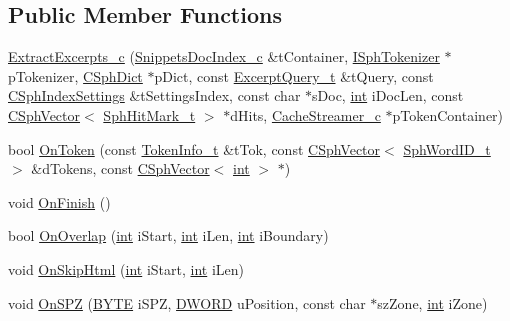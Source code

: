 \subsection*{Public Member Functions}
\begin{DoxyCompactItemize}
\item 
\hyperlink{classExtractExcerpts__c_a52457952280f31ca553f5a97fb16feb9}{Extract\-Excerpts\-\_\-c} (\hyperlink{classSnippetsDocIndex__c}{Snippets\-Doc\-Index\-\_\-c} \&t\-Container, \hyperlink{classISphTokenizer}{I\-Sph\-Tokenizer} $\ast$p\-Tokenizer, \hyperlink{classCSphDict}{C\-Sph\-Dict} $\ast$p\-Dict, const \hyperlink{structExcerptQuery__t}{Excerpt\-Query\-\_\-t} \&t\-Query, const \hyperlink{structCSphIndexSettings}{C\-Sph\-Index\-Settings} \&t\-Settings\-Index, const char $\ast$s\-Doc, \hyperlink{sphinxexpr_8cpp_a4a26e8f9cb8b736e0c4cbf4d16de985e}{int} i\-Doc\-Len, const \hyperlink{classCSphVector}{C\-Sph\-Vector}$<$ \hyperlink{structSphHitMark__t}{Sph\-Hit\-Mark\-\_\-t} $>$ $\ast$d\-Hits, \hyperlink{classCacheStreamer__c}{Cache\-Streamer\-\_\-c} $\ast$p\-Token\-Container)
\item 
bool \hyperlink{classExtractExcerpts__c_afdc36b5d8a7e7117d2e9519f121c9e70}{On\-Token} (const \hyperlink{structTokenInfo__t}{Token\-Info\-\_\-t} \&t\-Tok, const \hyperlink{classCSphVector}{C\-Sph\-Vector}$<$ \hyperlink{sphinx_8h_a80a94d5984fdf9214a98f3e5e65df963}{Sph\-Word\-I\-D\-\_\-t} $>$ \&d\-Tokens, const \hyperlink{classCSphVector}{C\-Sph\-Vector}$<$ \hyperlink{sphinxexpr_8cpp_a4a26e8f9cb8b736e0c4cbf4d16de985e}{int} $>$ $\ast$)
\item 
void \hyperlink{classExtractExcerpts__c_a71ecb0fad5dc0977e084d684830cdfe6}{On\-Finish} ()
\item 
bool \hyperlink{classExtractExcerpts__c_a613089ffd79cd73f0c1721e39a802b6c}{On\-Overlap} (\hyperlink{sphinxexpr_8cpp_a4a26e8f9cb8b736e0c4cbf4d16de985e}{int} i\-Start, \hyperlink{sphinxexpr_8cpp_a4a26e8f9cb8b736e0c4cbf4d16de985e}{int} i\-Len, \hyperlink{sphinxexpr_8cpp_a4a26e8f9cb8b736e0c4cbf4d16de985e}{int} i\-Boundary)
\item 
void \hyperlink{classExtractExcerpts__c_adcd9fedd2b42fe052b6c00bce687ae72}{On\-Skip\-Html} (\hyperlink{sphinxexpr_8cpp_a4a26e8f9cb8b736e0c4cbf4d16de985e}{int} i\-Start, \hyperlink{sphinxexpr_8cpp_a4a26e8f9cb8b736e0c4cbf4d16de985e}{int} i\-Len)
\item 
void \hyperlink{classExtractExcerpts__c_af34d7e004ad9e1b1ef8b3c8a8364ab1c}{On\-S\-P\-Z} (\hyperlink{sphinxstd_8h_a4ae1dab0fb4b072a66584546209e7d58}{B\-Y\-T\-E} i\-S\-P\-Z, \hyperlink{sphinxstd_8h_a798af1e30bc65f319c1a246cecf59e39}{D\-W\-O\-R\-D} u\-Position, const char $\ast$sz\-Zone, \hyperlink{sphinxexpr_8cpp_a4a26e8f9cb8b736e0c4cbf4d16de985e}{int} i\-Zone)

\end{DoxyCompactItemize}
